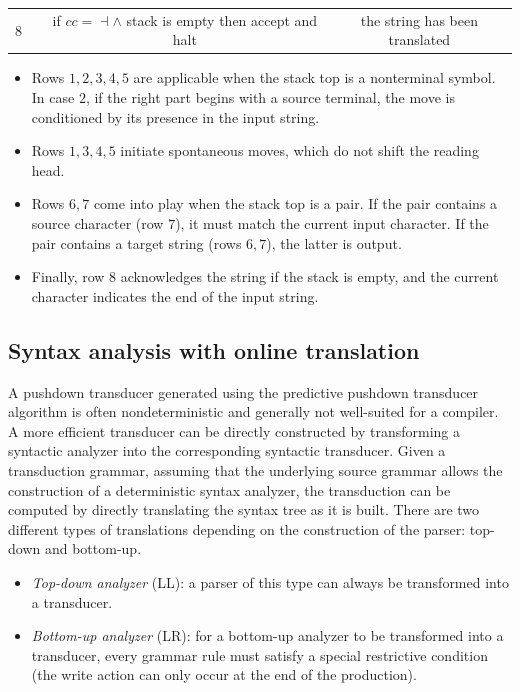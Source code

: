 \begin{table}[H]
{\begin{tabular}{c|c|c|c}
    8             &                                                                                                                                                         & \makecell[l]{if $cc=\dashv \land$ stack is empty \\ then accept and halt}                                                 & the string has been translated                
    \end{tabular}%
    }
\end{table}
\begin{itemize}
    \item Rows $1, 2, 3, 4, 5$ are applicable when the stack top is a nonterminal symbol.
        In case $2$, if the right part begins with a source terminal, the move is conditioned by its presence in the input string.
    \item Rows $1, 3, 4, 5$ initiate spontaneous moves, which do not shift the reading head.
    \item Rows $6, 7$ come into play when the stack top is a pair.
        If the pair contains a source character (row $7$), it must match the current input character.
        If the pair contains a target string (rows $6, 7$), the latter is output.
    \item Finally, row $8$ acknowledges the string if the stack is empty, and the current character indicates the end of the input string.
\end{itemize}

\subsection{Syntax analysis with online translation}
A pushdown transducer generated using the predictive pushdown transducer algorithm is often nondeterministic and generally not well-suited for a compiler. 
A more efficient transducer can be directly constructed by transforming a syntactic analyzer into the corresponding syntactic transducer. 
Given a transduction grammar, assuming that the underlying source grammar allows the construction of a deterministic syntax analyzer, the transduction can be computed by directly translating the syntax tree as it is built.
There are two different types of translations depending on the construction of the parser: top-down and bottom-up.
\begin{itemize}
    \item \textit{Top-down analyzer} (LL): a parser of this type can always be transformed into a transducer.
    \item \textit{Bottom-up analyzer} (LR): for a bottom-up analyzer to be transformed into a transducer, every grammar rule must satisfy a special restrictive condition (the write action can only occur at the end of the production).
\end{itemize}

